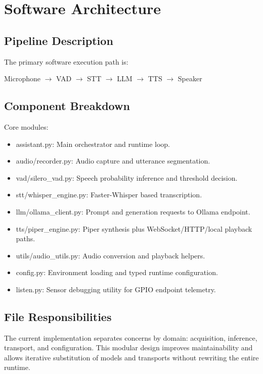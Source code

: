 \documentclass[12pt,a4paper]{article}
\begin{document}
\section{Software Architecture}

\subsection{Pipeline Description}
The primary software execution path is:
\begin{center}
Microphone $\rightarrow$ VAD $\rightarrow$ STT $\rightarrow$ LLM $\rightarrow$ TTS $\rightarrow$ Speaker
\end{center}

\subsection{Component Breakdown}
Core modules:
\begin{itemize}
    \item assistant.py: Main orchestrator and runtime loop.
    \item audio/recorder.py: Audio capture and utterance segmentation.
    \item vad/silero\_vad.py: Speech probability inference and threshold decision.
    \item stt/whisper\_engine.py: Faster-Whisper based transcription.
    \item llm/ollama\_client.py: Prompt and generation requests to Ollama endpoint.
    \item tts/piper\_engine.py: Piper synthesis plus WebSocket/HTTP/local playback paths.
    \item utils/audio\_utils.py: Audio conversion and playback helpers.
    \item config.py: Environment loading and typed runtime configuration.
    \item listen.py: Sensor debugging utility for GPIO endpoint telemetry.
\end{itemize}

\subsection{File Responsibilities}
The current implementation separates concerns by domain: acquisition, inference, transport, and configuration. This modular design improves maintainability and allows iterative substitution of models and transports without rewriting the entire runtime.
\end{document}

